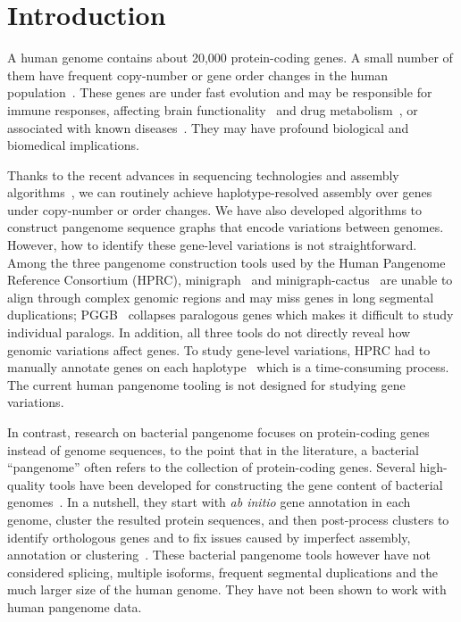 \documentclass[webpdf,contemporary,large,namedate]{oup-authoring-template}%
\begin{document}
\section{Introduction}

A human genome contains about 20,000 protein-coding genes.
A small number of them have frequent copy-number or gene order changes in the human population~\citep{Sudmant:2010aa,Handsaker:2015ur}.
These genes are under fast evolution
and may be responsible for immune responses,
affecting brain functionality~\citep{Ju:2016aa} and drug metabolism~\citep{Taylor:2020aa},
or associated with known diseases~\citep{Mercuri:2022aa}.
They may have profound biological and biomedical implications.

Thanks to the recent advances in sequencing technologies \citep{Wenger_2019} and assembly algorithms~\citep{Nurk:2020we,Cheng:2021aa,Rautiainen:2023aa},
we can routinely achieve haplotype-resolved assembly over genes under copy-number or order changes.
We have also developed algorithms to construct pangenome sequence graphs that encode variations between genomes.
However, how to identify these gene-level variations is not straightforward.
Among the three pangenome construction tools used by the Human Pangenome Reference Consortium (HPRC),
minigraph~\citep{Li:2020aa} and minigraph-cactus~\citep{Hickey:2023aa} are
unable to align through complex genomic regions and may miss genes in long segmental duplications;
PGGB~\citep{Garrison2023.04.05.535718} collapses paralogous genes which makes it difficult to study individual paralogs.
In addition, all three tools do not directly reveal how genomic variations affect genes.
To study gene-level variations, HPRC
had to manually annotate genes on each haplotype~\citep{Liao:2023aa} which is a time-consuming process.
The current human pangenome tooling is not designed for studying gene variations.

In contrast, research on bacterial pangenome
focuses on protein-coding genes instead of genome sequences, to the point that
in the literature, a bacterial ``pangenome'' often refers to the collection of protein-coding genes.
Several high-quality tools have been developed for constructing the gene content of bacterial genomes~\citep{Page:2015aa,Ding:2018aa,Tonkin-Hill:2020aa,Gautreau:2020aa,Zhou:2020aa}.
In a nutshell, they start with \emph{ab initio} gene annotation in each genome,
cluster the resulted protein sequences,
and then post-process clusters to identify orthologous genes
and to fix issues caused by imperfect assembly, annotation or clustering~\citep{Tonkin-Hill:2023aa}.
These bacterial pangenome tools however have not considered splicing,
multiple isoforms, frequent segmental duplications and the much larger size of the human genome.
They have not been shown to work with human pangenome data.
\end{document}
